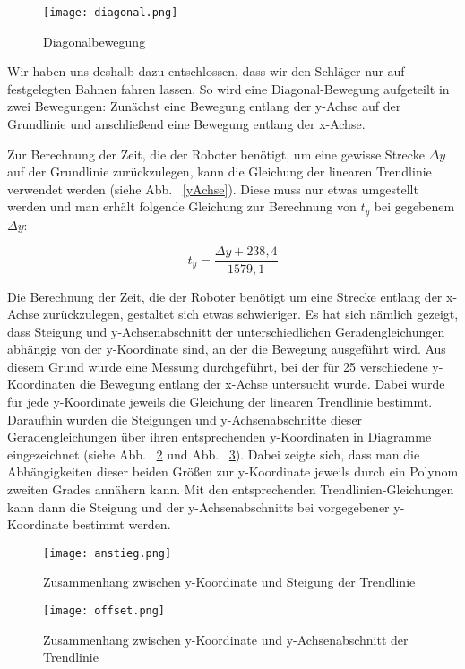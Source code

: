 \begin{figure}[htbp]
\centering
\texttt{[image: diagonal.png]}
\caption{Diagonalbewegung} 
\label{diagonal}
\end{figure} 

Wir haben uns deshalb dazu entschlossen, dass wir den Schläger nur auf festgelegten Bahnen fahren lassen. So wird eine Diagonal-Bewegung aufgeteilt in zwei Bewegungen: Zunächst eine Bewegung entlang der y-Achse auf der Grundlinie und anschließend eine Bewegung entlang der x-Achse. 

Zur Berechnung der Zeit, die der Roboter benötigt, um eine gewisse Strecke $ \Delta y $ auf der Grundlinie zurückzulegen, kann die Gleichung der linearen Trendlinie verwendet werden (siehe Abb. ~\ref{yAchse}). Diese muss nur etwas umgestellt werden und man erhält folgende Gleichung zur Berechnung von $ t_y $ bei gegebenem $ \Delta y $:

\begin{equation}
t_y =\frac{\Delta y + 238,4}{1579,1}
\end{equation} 

Die Berechnung der Zeit, die der Roboter benötigt um eine Strecke entlang der x-Achse zurückzulegen, gestaltet sich etwas schwieriger. Es hat sich nämlich gezeigt, dass Steigung und y-Achsenabschnitt der unterschiedlichen Geradengleichungen abhängig von der y-Koordinate sind, an der die Bewegung ausgeführt wird. Aus diesem Grund wurde eine Messung durchgeführt, bei der für 25 verschiedene y-Koordinaten die Bewegung entlang der x-Achse untersucht wurde. Dabei wurde für jede y-Koordinate jeweils die Gleichung der linearen Trendlinie bestimmt. Daraufhin wurden die Steigungen und y-Achsenabschnitte dieser Geradengleichungen über ihren entsprechenden y-Koordinaten in Diagramme eingezeichnet (siehe Abb. ~\ref{anstieg} und Abb. ~\ref{offset}). Dabei zeigte sich, dass man die Abhängigkeiten dieser beiden Größen zur y-Koordinate jeweils durch ein Polynom zweiten Grades annähern kann. Mit den entsprechenden Trendlinien-Gleichungen kann dann die Steigung und der y-Achsenabschnitts bei vorgegebener y-Koordinate bestimmt werden. 

\begin{figure}[htbp]
\centering
\texttt{[image: anstieg.png]}
\caption{Zusammenhang zwischen y-Koordinate und Steigung der Trendlinie} 
\label{anstieg}
\end{figure}

\begin{figure}[htbp]
\centering
\texttt{[image: offset.png]}
\caption{Zusammenhang zwischen y-Koordinate und y-Achsenabschnitt der Trendlinie} 
\label{offset}
\end{figure}

